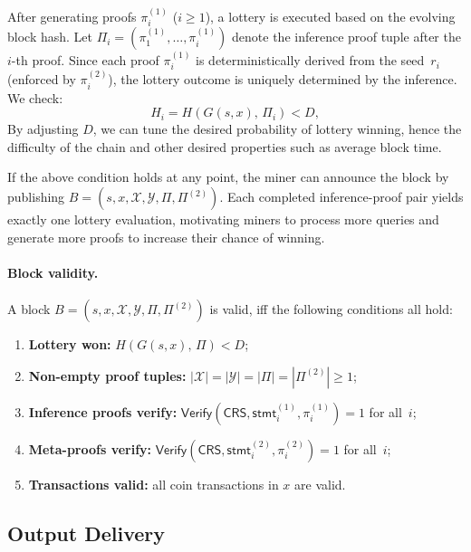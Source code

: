 After generating proofs $\pi_i^{(1)}$ ($i \geq 1$), a lottery is executed based on the evolving block hash. Let $\Pi_i = (\pi_1^{(1)}, \ldots, \pi_i^{(1)})$ denote the inference proof tuple after the $i$-th proof. Since each proof $\pi_i^{(1)}$ is deterministically derived from the seed~$r_i$ (enforced by $\pi_i^{(2)}$), the lottery outcome is uniquely determined by the inference. We check:
\begin{equation}
H_i = H(G(s,x),\, \Pi_i) < D,
\end{equation} By adjusting $D$, we can tune the desired probability of lottery winning, hence the difficulty of the chain and other desired properties such as average block time.

If the above condition holds at any point, the miner can announce the block by publishing $B = (s, x, \mathcal{X}, \mathcal{Y}, \Pi, \Pi^{(2)})$. Each completed inference-proof pair yields exactly one lottery evaluation, motivating miners to process more queries and generate more proofs to increase their chance of winning.

\paragraph{Block validity.}

\begin{definition}
\label{def:valid-block}
A block $B = (s,x,\mathcal{X}, \mathcal{Y}, \Pi, \Pi^{(2)})$ is valid,  iff the following conditions all hold:
\begin{enumerate}[nosep]
    \item \textbf{Lottery won:} $H(G(s,x),\, \Pi) < D$;
    \item \textbf{Non-empty proof tuples:} $|\mathcal{X}|=|\mathcal{Y}|=|\Pi|=|\Pi^{(2)}| \ge 1$;
    \item \textbf{Inference proofs verify:} $\mathsf{Verify}(\mathsf{CRS}, \mathsf{stmt}_i^{(1)}, \pi_i^{(1)}) = 1$ for all~$i$;
    \item \textbf{Meta-proofs verify:} $\mathsf{Verify}(\mathsf{CRS}, \mathsf{stmt}_i^{(2)}, \pi_i^{(2)}) = 1$ for all~$i$;
    \item \textbf{Transactions valid:} all coin transactions in $x$ are valid.
\end{enumerate}
\end{definition}

\subsection{Output Delivery}
\label{subsec:output-delivery}

